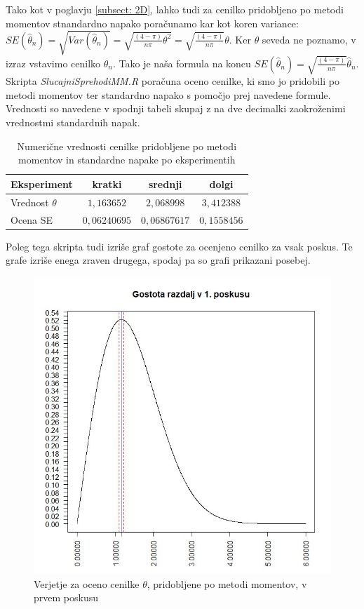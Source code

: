 \documentclass[a4paper, 10pt]{article}
\begin{document}
	Tako kot v poglavju \ref{subsect: 2D}, lahko tudi za cenilko pridobljeno po metodi momentov stnandardno napako poračunamo kar kot koren variance: $SE(\widehat{\theta}_n) = \sqrt{Var(\widehat{\theta}_n)} = \sqrt{\frac{(4-\pi)}{n\pi}\theta^2} = \sqrt{\frac{(4-\pi)}{n\pi}}\theta$. Ker $\theta$ seveda ne poznamo, v izraz vstavimo cenilko $\widehat{\theta}_n$. Tako je naša formula na koncu $SE(\widehat{\theta}_n) = \sqrt{\frac{(4-\pi)}{n\pi}}\widehat{\theta}_n$. Skripta \textit{SlucajniSprehodiMM.R} poračuna oceno cenilke, ki smo jo pridobili po metodi momentov ter standardno napako s pomočjo prej navedene formule. Vrednosti so navedene v spodnji tabeli skupaj z na dve decimalki zaokroženimi vrednostmi standardnih napak.
	
	\begin{table}[h!]
		\label{tab: mmse}
		\centering
		\begin{tabular}{|l|c|c|c|}
			\hline
			Eksperiment & kratki & srednji & dolgi \\ \hline
			Vrednost $\theta$ & $1{,}163652$ & $2{,}068998$ & $3{,}412388$ \\ \hline
			Ocena SE & $0{,}06240695$ & $0{,}06867617$ & $0{,}1558456$ \\ \hline
		\end{tabular}
		\caption{Numerične vrednosti cenilke pridobljene po metodi momentov in standardne napake po eksperimentih}
	\end{table}

	Poleg tega skripta tudi izriše graf gostote za ocenjeno cenilko za vsak poskus. Te grafe izriše enega zraven drugega, spodaj pa so grafi prikazani posebej.
	
	\begin{figure}[h!]
		\label{fig: 2Eplot1}
		\centering
		\includegraphics[scale = 0.35]{VerjetjeMM1}
		\caption{Verjetje za oceno cenilke $\theta$, pridobljene po metodi momentov, v prvem poskusu}
	\end{figure}
	
\end{document}

